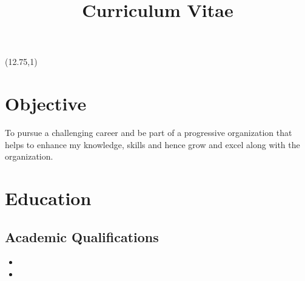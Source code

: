 \documentclass[10pt,a4paper,sans]{moderncv}
\title{Curriculum Vitae}
\begin{document}
	\hskip -3cm {\makecvtitle}
	\begin{textblock}{0}(12.75,1)
		\fboxsep=1mm
		\fboxrule=1pt
	\end{textblock}

	
	\section{Objective}	
		\vspace{5pt}
		\small{To pursue a challenging career and be part of a progressive organization that helps to enhance my knowledge, skills and hence grow and excel along with the organization.} 

	
	\section{Education}
		
		\vspace{5pt}
		\subsection{Academic Qualifications}
			
			\begin{itemize}

				\vspace{2pt}
				\item{}
				\vspace{2pt}
				\item{}

			\end{itemize}
		
\end{document}
